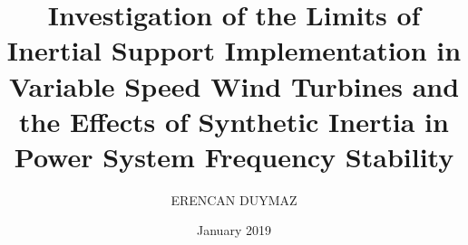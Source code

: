 \documentclass[chaparabic,ee,ms,12pt,oneandhalf]{metu}
\author{ERENCAN DUYMAZ}
\title{Investigation of the Limits of Inertial Support Implementation in Variable Speed Wind Turbines and the Effects of Synthetic Inertia in Power System Frequency Stability}
\date{January 2019}
\begin{document}
\begin{preliminaries}



\end{preliminaries}
%   
% 
%

\setlength{\parindent}{0em}
\setlength{\parskip}{10pt}











%
%

%

\appendices


\end{document}
